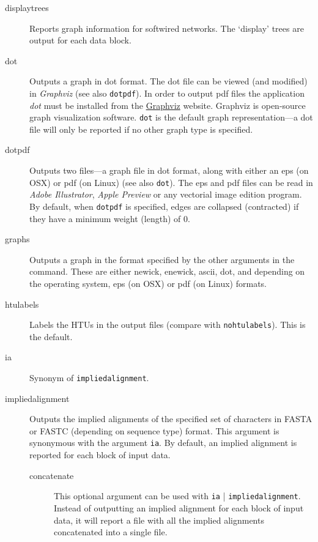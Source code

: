\begin{description}
		\item[displaytrees] Reports graph information for softwired networks. The 
		`display' trees are output for each data block. 
		
		\item[dot] Outputs a graph in dot format. The dot file can be viewed (and 
		modified) in \textit{Graphviz} (see also \texttt{dotpdf}). In order to output pdf 
		files the application \textit{dot} must be installed from the 
		\href{https://graphviz.org/download/}{Graphviz} 	website. Graphviz is 
		open-source graph visualization software. \texttt{dot} is the default graph 
		representation---a dot file will only be reported if no 
		other graph type is specified. 
		
		\item[dotpdf] Outputs two files---a graph file in dot format, along with either
		an eps (on OSX) or pdf (on Linux) (see also \texttt{dot}). The eps and pdf 
		files can be read in \textit{Adobe Illustrator}, \textit{Apple Preview} or any 
		vectorial image edition program.  By default, when \texttt{dotpdf} is specified,
		edges are collapsed (contracted) if they have a minimum weight 
		(length) of 0.
		
		
		\item[graphs] Outputs a graph in the format specified by the other arguments 
		in the command. These are either newick, enewick, ascii, dot, and depending 
		on the operating system, eps (on OSX) or pdf (on Linux) formats.
		
		\item[htulabels] Labels the HTUs in the output files (compare with 
		\texttt{nohtulabels}). This is the default.
		
		\item[ia] Synonym of \texttt{impliedalignment}.
		
		\item[impliedalignment] Outputs the implied alignments of the specified 
		set of characters in FASTA or FASTC (depending on sequence type) format. 
		This argument is synonymous with 
		the argument \texttt{ia}. By default, an implied alignment is reported for 
		each block of input data. 
		
		\begin{description}
			\item[concatenate] This optional argument can be used with \texttt{ia}
			| \texttt{impliedalignment}. Instead of outputting an implied alignment 
			for each block of input data, it will report a file with all the implied 
			alignments concatenated into a single file.
			

\end{description}
\end{description}

